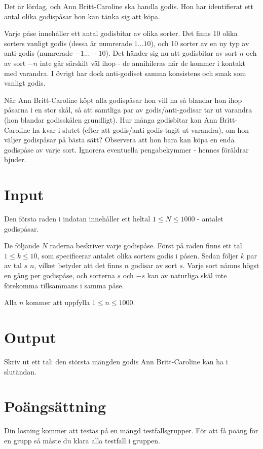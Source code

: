 Det är lördag, och Ann Britt-Caroline ska handla godis. Hon har identifierat ett antal olika godispåsar hon kan tänka sig att köpa.

Varje påse innehåller ett antal godisbitar av olika sorter. Det finns 10 olika sorters vanligt godis (dessa är numrerade $1...10$), och 10 sorter av en ny typ av anti-godis (numrerade $-1...-10$). Det händer sig nu att godisbitar av sort $n$ och av sort $-n$ inte går särskilt väl ihop - de annihileras när de kommer i kontakt med varandra. I övrigt har dock anti-godiset samma konsistens och smak som vanligt godis.

När Ann Britt-Caroline köpt alla godispåsar hon vill ha så blandar hon ihop påsarna i en stor skål, så att samtliga par av godis/anti-godisar tar ut varandra (hon blandar godisskålen grundligt). Hur många godisbitar kan Ann Britt-Caroline ha kvar i slutet (efter att godis/anti-godis tagit ut varandra), om hon väljer godispåsar på bästa sätt? Observera att hon bara kan köpa en enda godispåse av varje sort. Ignorera eventuella pengabekymmer - hennes föräldrar bjuder.

\section*{Input}
Den första raden i indatan innehåller ett heltal $1 \le N \le 1000$ - antalet godispåsar.

De följande $N$ raderna beskriver varje godispåse.
Först på raden finns ett tal $1 \le k \le 10$, som specificerar antalet olika sorters godis i påsen.
Sedan följer $k$ par av tal $s$ $n$, vilket betyder att det finns $n$ godisar av sort $s$.
Varje sort nämns högst en gång per godispåse, och sorterna $s$ och $-s$ kan av naturliga skäl inte förekomma tillsammans i samma påse.

Alla $n$ kommer att uppfylla $1 \le n \le 1000$.

\section*{Output}
Skriv ut ett tal: den största mängden godis Ann Britt-Caroline kan ha i slutändan.

\section*{Poängsättning}
Din lösning kommer att testas på en mängd testfallsgrupper. För att få poäng för en grupp så måste du klara alla testfall i gruppen.

